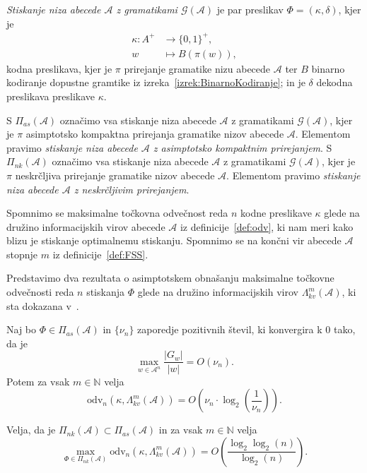 \documentclass[fin1, tisk]{fmfdelo}
\providecommand{\abs}[1]{\left\lvert #1 \right\rvert}
\newcommand{\N}{\mathbb{N}}
\newcommand{\A}{\mathcal{A}}
\newcommand{\G}{\mathcal{G}}
\theoremstyle{definition}
\begin{document}
\begin{definicija}
    \emph{Stiskanje niza abecede $\A$ z gramatikami $\G(\A)$} je 
    par preslikav $\varPhi = (\kappa, \delta)$, kjer je
    \begin{align*}
        \kappa \colon A^+ &\to \{ 0, 1\}^+,\\
        w &\mapsto B(\pi(w)),
    \end{align*}
    kodna preslikava, kjer je $\pi$ prirejanje gramatike nizu abecede $\A$ ter
    $B$ binarno kodiranje dopustne gramtike iz izreka~\ref{izrek:BinarnoKodiranje}; in je
    $\delta$ dekodna preslikava preslikave $\kappa$.
\end{definicija}

\begin{definicija}
    S $\varPi_{as}(\A)$ označimo vsa stiskanje niza abecede $\A$ z gramatikami $\G(\A)$,
    kjer je $\pi$ asimptotsko kompaktna prirejanja gramatike nizov abecede $\A$. Elementom pravimo
    \emph{stiskanje niza abecede $\A$ z asimptotsko kompaktnim prirejanjem}.
    S $\varPi_{nk}(\A)$ označimo vsa stiskanje niza abecede $\A$ z gramatikami $\G(\A)$,
    kjer je $\pi$ neskrčljiva prirejanje gramatike nizov abecede $\A$. Elementom pravimo
    \emph{stiskanje niza abecede $\A$ z neskrčljivim prirejanjem}.
\end{definicija}

Spomnimo se maksimalne točkovna odvečnost reda $n$ kodne preslikave $\kappa$ glede
na družino informacijskih virov abecede $\A$ iz definicije~\ref{def:odv}, ki 
nam meri kako blizu je stiskanje optimalnemu stiskanju. Spomnimo se na končni vir abecede $\A$
stopnje $m$ iz definicije~\ref{def:FSS}. 

Predstavimo dva rezultata o asimptotskem obnašanju maksimalne točkovne odvečnosti reda $n$
stiskanja $\varPhi$ glede na družino informacijskih virov $\Lambda_{kv}^m(\A)$, ki sta dokazana
 v~\cite{KiefferYang2000}.

\begin{izrek}
    Naj bo $\varPhi \in \varPi_{as}(\A)$ in $\{ \nu_n \}$ zaporedje pozitivnih števil,
    ki konvergira k $0$ tako, da je
    \[
        \max_{w \in \A^n} \frac{\abs{G_w}}{\abs{w}} = O(\nu_n).
    \]
    Potem za vsak $m \in \N$ velja
    \[
        \text{odv}_n \left( \kappa, \Lambda_{kv}^m(\A) \right) =
        O \left( \nu_n \cdot \log_2 \left( \frac{1}{\nu_n} \right) \right).
    \]
\end{izrek}

\begin{izrek}\label{izrek:RedKonvergenca}
    Velja, da je $\varPi_{nk}(\A) \subset \varPi_{as}(\A)$ in za vsak $m \in \N$ velja 
    \[
        \max_{\varPhi \in \varPi_{nk}(\A)} \text{odv}_n \left( \kappa, \Lambda_{kv}^m(\A) \right) =
        O \left( \frac{\log_2 \log_2(n)}{\log_2(n)} \right).
    \]
\end{izrek}
\end{document}
